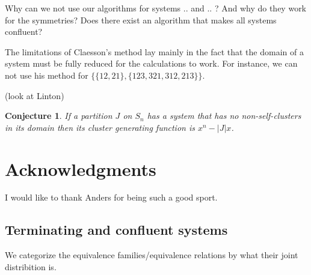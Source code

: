 \documentclass[openany, a4paper, 11pt, english]{article}
\newtheorem{conjecture}[theorem]{Conjecture}
\theoremstyle{definition}
\newcommand{\Sym}{S}
\begin{document}
Why can we not use our algorithms for systems .. and .. ? And why do they work
for the symmetries? Does there exist an algorithm that makes all systems confluent?

The limitations of Claesson's method lay mainly in the fact that the domain of a
system must be fully reduced for the calculations to work. For instance, we can not use his
method for $\{ \{ 12, 21 \}, \{ 123, 321, 312, 213 \} \}$.

(look at Linton)

\begin{conjecture}
    If a partition $J$ on $\Sym_n$ has a system that has no non-self-clusters in
    its domain then its cluster generating function is $x^n-|J|x$.
\end{conjecture}

\section*{Acknowledgments}
I would like to thank Anders for being such a good sport.




\begin{appendices}
\section{Terminating and confluent systems}
We categorize the equivalence families/equivalence relations by what their joint
distribition is.
\begin{multicols}{2}

\end{multicols}
\end{appendices}
\end{document}
